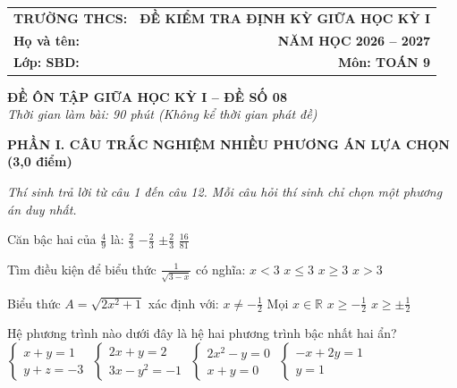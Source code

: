 \documentclass[12pt,a4paper]{article}
\begin{document}
\noindent
\begin{tabularx}{\linewidth}{X r}
\textbf{TRƯỜNG THCS: \dotfill} & \textbf{ĐỀ KIỂM TRA ĐỊNH KỲ GIỮA HỌC KỲ I} \\
\textbf{Họ và tên: \dotfill} & \textbf{NĂM HỌC 2026 -- 2027} \\
\textbf{Lớp: \dotfill \quad SBD: \dotfill} & \textbf{Môn: TOÁN 9} \\
\hline
\end{tabularx}
\vspace{2mm}

\begin{center}
  \textbf{\large ĐỀ ÔN TẬP GIỮA HỌC KỲ I -- ĐỀ SỐ 08}\\
  \textit{Thời gian làm bài: 90 phút (Không kể thời gian phát đề)}
\end{center}
\vspace{1mm}

\noindent\textbf{\large PHẦN I. CÂU TRẮC NGHIỆM NHIỀU PHƯƠNG ÁN LỰA CHỌN (3,0 điểm)}

\textit{Thí sinh trả lời từ câu 1 đến câu 12. Mỗi câu hỏi thí sinh chỉ chọn một phương án duy nhất.}

\vspace{1mm}
\begin{ex}
Căn bậc hai của $\frac{4}{9}$ là:
\choice
{$\frac{2}{3}$}
{$-\frac{2}{3}$}
{\True $\pm \frac{2}{3}$}
{$\frac{16}{81}$}
\end{ex}

\begin{ex}
Tìm điều kiện để biểu thức $\frac{1}{\sqrt{3 - x}}$ có nghĩa:
\choice
{\True $x < 3$}
{$x \le 3$}
{$x \ge 3$}
{$x > 3$}
\end{ex}

\begin{ex}
Biểu thức $A = \sqrt{2x^2 + 1}$ xác định với:
\choice
{$x \neq -\frac{1}{2}$}
{\True Mọi $x \in \mathbb{R}$}
{$x \ge -\frac{1}{2}$}
{$x \ge \pm \frac{1}{2}$}
\end{ex}

\begin{ex}
Hệ phương trình nào dưới đây là hệ hai phương trình bậc nhất hai ẩn?
\choice
{$\begin{cases} x + y = 1 \\ y + z = -3 \end{cases}$}
{$\begin{cases} 2x + y = 2 \\ 3x - y^2 = -1 \end{cases}$}
{$\begin{cases} 2x^2 - y = 0 \\ x + y = 0 \end{cases}$}
{\True $\begin{cases} -x + 2y = 1 \\ y = 1 \end{cases}$}
\end{ex}
\end{document}
